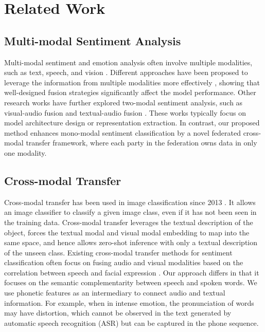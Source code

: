 \documentclass[11pt]{article}
\begin{document}

\section{Related Work}
\label{sec:related}
\subsection{Multi-modal Sentiment Analysis}
Multi-modal sentiment and emotion analysis often involve multiple modalities, such as text, speech, and vision \cite{wollmer2013youtube,rozgic2012ensemble}. Different approaches have been proposed to leverage the information from multiple modalities more effectively \cite{zadeh2017tensor, majumder2018multimodal, poria2016convolutional}, showing that well-designed fusion strategies significantly affect the model performance. Other research works have further explored two-modal sentiment analysis, such as visual-audio fusion \cite{metallinou2008audio,wollmer2013youtube} and textual-audio fusion \cite{li2019acoustic, poria2017context}. These works typically focus on model architecture design or representation extraction. In contrast, our proposed method enhances mono-modal sentiment classification by a novel federated cross-modal transfer framework, where each party in the federation owns data in only one modality.

\subsection{Cross-modal Transfer}
Cross-modal transfer has been used in image classification since 2013 \cite{socher2013zero}. It allows an image classifier to classify a given image class, even if it has not been seen in the training data. Cross-modal transfer leverages the textual description of the object, forces the textual modal and visual modal embedding to map into the same space, and hence allows zero-shot inference with only a textual description of the unseen class. Existing cross-modal transfer methods for sentiment classification often focus on fusing audio and visual modalities based on the correlation between speech and facial expression \cite{albanie2018emotion, dumpala2019audio}. Our approach differs in that it focuses on the semantic complementarity between speech and spoken words. We use phonetic features as an intermediary to connect audio and textual information. For example, when in intense emotion, the pronunciation of words may have distortion, which cannot be observed in the text generated by automatic speech recognition (ASR) but can be captured in the phone sequence.
\end{document}
